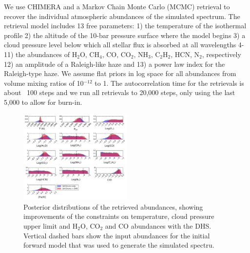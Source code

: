 \documentclass[iop]{emulateapj}
\begin{document}
We use CHIMERA and a Markov Chain Monte Carlo (MCMC) retrieval to recover the individual atmospheric abundances of the simulated spectrum.
The retrieval model includes 13 free parameters: 1) the temperature of the isothermal profile 2) the altitude of the 10-bar pressure surface where the model begins 3) a cloud pressure level below which all stellar flux is absorbed at all wavelengths 4-11) the abundances of H$_2$O, CH$_4$, CO, CO$_2$, NH$_3$, C$_2$H$_2$, HCN, N$_2$, respectively 12) an amplitude of a Raleigh-like haze and 13) a power law index for the Raleigh-type haze.
We assume flat priors in log space for all abundances from volume mixing ratios of 10$^{-12}$ to 1.
The autocorrelation time for the retrievals is about ~100 steps and we run all retrievals to 20,000 steps, only using the last 5,000 to allow for burn-in.

\begin{figure}
\centering
\includegraphics[width=0.5\textwidth]{HD209458b_solar_clear_DHS.pdf}
\caption{Posterior distributions of the retrieved abundances, showing improvements of the constraints on temperature, cloud pressure upper limit and H$_2$O, CO$_2$ and CO abundances with the DHS.
Vertical dashed bars show the input abundances for the initial forward model that was used to generate the simulated spectru.}\label{fig:DHSposterios}
\end{figure}
\end{document}
